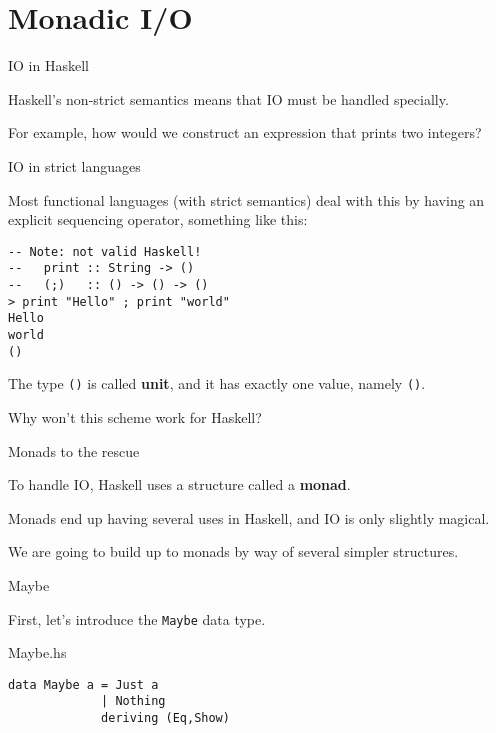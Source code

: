 
\section{Monadic I/O}

%
\begin{frame}[fragile]{IO in Haskell}

Haskell's non-strict semantics means that IO must be handled specially.

For example, how would we construct an expression that prints two integers?

\end{frame}

%
\begin{frame}[fragile]{IO in strict languages}

Most functional languages (with strict semantics) deal with this by having an
explicit sequencing operator, something like this:

\begin{block}{}
\begin{verbatim}
-- Note: not valid Haskell!
--   print :: String -> ()
--   (;)   :: () -> () -> ()
> print "Hello" ; print "world"
Hello
world
()
\end{verbatim}
\end{block}

The type \texttt{()} is called \textbf{unit}, and it has exactly one value,
namely \texttt{()}.

Why won't this scheme work for Haskell?

\end{frame}

%
\begin{frame}[fragile]{Monads to the rescue}

To handle IO, Haskell uses a structure called a \textbf{monad}.

Monads end up having several uses in Haskell, and IO is only slightly magical.

We are going to build up to monads by way of several simpler structures.

\end{frame}

%
\begin{frame}[fragile]{Maybe}

First, let's introduce the \texttt{Maybe} data type.

\begin{block}{Maybe.hs}
\begin{verbatim}
data Maybe a = Just a
             | Nothing
             deriving (Eq,Show)
\end{verbatim}
\end{block}

\end{frame}

